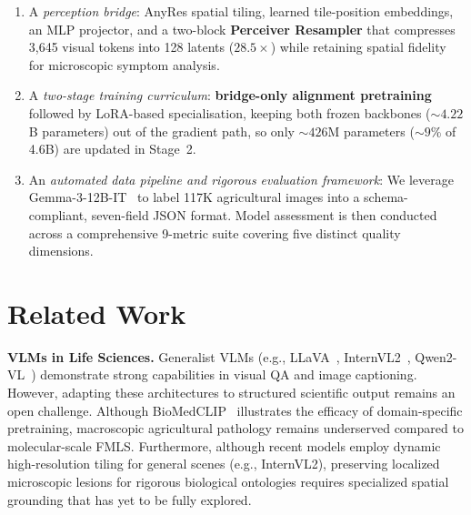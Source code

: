 \documentclass{article}
\begin{document}
\begin{enumerate}[leftmargin=*,topsep=2pt,itemsep=1pt]
  \item A \emph{perception bridge}: AnyRes spatial tiling, learned
        tile-position embeddings, an MLP projector, and a two-block \textbf{Perceiver Resampler} that compresses 3,645 visual tokens into 128 latents ($28.5\times$) while retaining spatial fidelity for microscopic symptom analysis.

  \item A \emph{two-stage training curriculum}: \textbf{bridge-only alignment
        pretraining} followed by LoRA-based specialisation, keeping both
        frozen backbones (${{\sim}}4.22$B parameters) out of the gradient
        path, so only ${{\sim}}426$M parameters (${{\sim}}9\%$ of 4.6B) are
        updated in Stage~2.

  \item An \emph{automated data pipeline and rigorous evaluation framework}:
        We leverage Gemma-3-12B-IT~\citep{gemmateam2025gemma3} to label 117K agricultural
        images into a schema-compliant, seven-field JSON format. Model assessment is then 
        conducted across a comprehensive 9-metric suite covering five distinct quality dimensions.
\end{enumerate}

\section{Related Work}
\label{sec:related}

\smallskip\noindent\textbf{VLMs in Life Sciences.}
Generalist VLMs (e.g., LLaVA~\citep{liu2024visual}, InternVL2~\citep{chen2024internvl}, Qwen2-VL~\citep{wang2024qwen2vl}) demonstrate strong capabilities in visual QA and image captioning. However, adapting these architectures to structured scientific output remains an open challenge. Although BioMedCLIP~\citep{zhang2023biomedclip} illustrates the efficacy of domain-specific pretraining, macroscopic agricultural pathology remains underserved compared to molecular-scale FMLS. Furthermore, although recent models employ dynamic high-resolution tiling for general scenes (e.g., InternVL2), preserving localized microscopic lesions for rigorous biological ontologies requires specialized spatial grounding that has yet to be fully explored.
\end{document}
